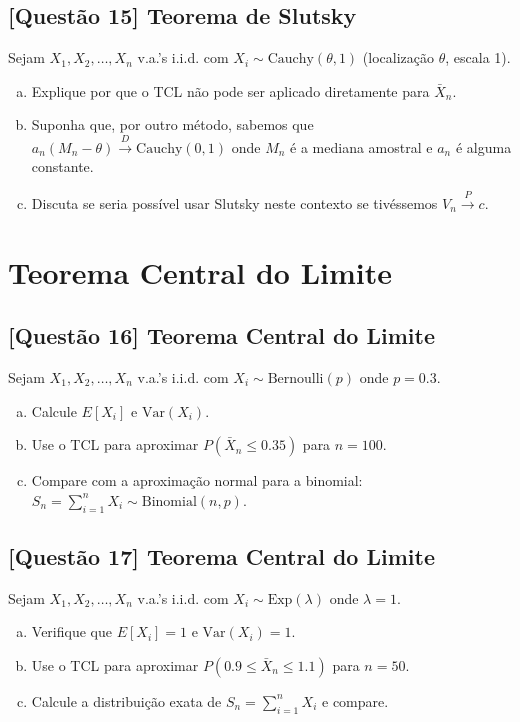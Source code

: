 \documentclass[12pt,a4paper]{article}
\begin{document}
\subsection*{[Questão 15] Teorema de Slutsky}

Sejam $X_1, X_2, \ldots, X_n$ v.a.'s i.i.d. com $X_i \sim \text{Cauchy}(\theta, 1)$ (localização $\theta$, escala 1).

\begin{enumerate}[(a)]
    \item Explique por que o TCL não pode ser aplicado diretamente para $\bar{X}_n$.
    \item Suponha que, por outro método, sabemos que $a_n(M_n - \theta) \xrightarrow{D} \text{Cauchy}(0,1)$ onde $M_n$ é a mediana amostral e $a_n$ é alguma constante.
    \item Discuta se seria possível usar Slutsky neste contexto se tivéssemos $V_n \xrightarrow{P} c$.
\end{enumerate}

\section{Teorema Central do Limite}

\subsection*{[Questão 16] Teorema Central do Limite}

Sejam $X_1, X_2, \ldots, X_n$ v.a.'s i.i.d. com $X_i \sim \text{Bernoulli}(p)$ onde $p = 0.3$.

\begin{enumerate}[(a)]
    \item Calcule $E[X_i]$ e $\text{Var}(X_i)$.
    \item Use o TCL para aproximar $P(\bar{X}_n \leq 0.35)$ para $n = 100$.
    \item Compare com a aproximação normal para a binomial: $S_n = \sum_{i=1}^n X_i \sim \text{Binomial}(n, p)$.
\end{enumerate}

\subsection*{[Questão 17] Teorema Central do Limite}

Sejam $X_1, X_2, \ldots, X_n$ v.a.'s i.i.d. com $X_i \sim \text{Exp}(\lambda)$ onde $\lambda = 1$.

\begin{enumerate}[(a)]
    \item Verifique que $E[X_i] = 1$ e $\text{Var}(X_i) = 1$.
    \item Use o TCL para aproximar $P(0.9 \leq \bar{X}_n \leq 1.1)$ para $n = 50$.
    \item Calcule a distribuição exata de $S_n = \sum_{i=1}^n X_i$ e compare.
\end{enumerate}
\end{document}
